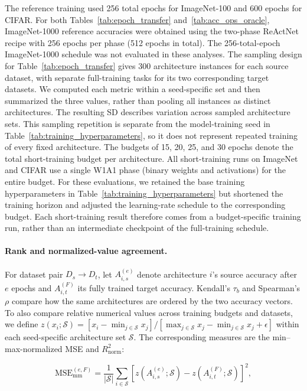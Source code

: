 \documentclass[preprint,review,12p,times]{elsarticle}
\begin{document}
The reference training used 256 total epochs for ImageNet-100 and 600 epochs for CIFAR. For both Tables~\ref{tab:epoch_transfer} and~\ref{tab:acc_ops_oracle}, ImageNet-1000 reference accuracies were obtained using the two-phase ReActNet recipe with 256 epochs per phase (512 epochs in total). The 256-total-epoch ImageNet-1000 schedule was not evaluated in these analyses. The sampling design for Table~\ref{tab:epoch_transfer} gives 300 architecture instances for each source dataset, with separate full-training tasks for its two corresponding target datasets. We computed each metric within a seed-specific set and then summarized the three values, rather than pooling all instances as distinct architectures. The resulting SD describes variation across sampled architecture sets. This sampling repetition is separate from the model-training seed in Table~\ref{tab:training_hyperparameters}, so it does not represent repeated training of every fixed architecture.
The budgets of 15, 20, 25, and 30 epochs denote the total short-training budget per architecture. All short-training runs on ImageNet and CIFAR use a single W1A1 phase (binary weights and activations) for the entire budget. For these evaluations, we retained the base training hyperparameters in Table~\ref{tab:training_hyperparameters} but shortened the training horizon and adjusted the learning-rate schedule to the corresponding budget. Each short-training result therefore comes from a budget-specific training run, rather than an intermediate checkpoint of the full-training schedule.

\paragraph{Rank and normalized-value agreement.}

For dataset pair $D_s\!\to\!D_t$, let $A_{i,s}^{(e)}$ denote architecture $i$'s source accuracy after $e$ epochs and $A_{i,t}^{(F)}$ its fully trained target accuracy. Kendall's $\tau_b$ and Spearman's $\rho$ compare how the same architectures are ordered by the two accuracy vectors. To also compare relative numerical values across training budgets and datasets, we define $z(x_i;\mathcal S)=[x_i-\min_{j\in\mathcal S}x_j]/[\max_{j\in\mathcal S}x_j-\min_{j\in\mathcal S}x_j+\epsilon]$ within each seed-specific architecture set $\mathcal S$. The corresponding measures are the min--max-normalized MSE and $R^2_{\mathrm{norm}}$:

\begin{equation}
\mathrm{MSE}_{\mathrm{mm}}^{(e,F)}=\frac{1}{|\mathcal S|}\sum_{i\in\mathcal S}\left[z(A_{i,s}^{(e)};\mathcal S)-z(A_{i,t}^{(F)};\mathcal S)\right]^2,
\end{equation}
\end{document}
